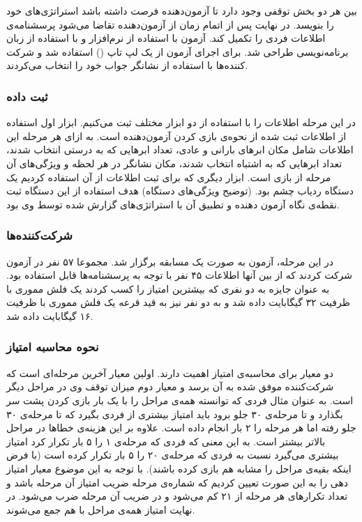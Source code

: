 \documentclass[twoside, a4paper,11pt]{book}
\numberwithin{equation}{chapter}
\numberwithin{table}{chapter}
\numberwithin{figure}{chapter}
\numberwithin{equation}{chapter}
\begin{document}
بین هر دو بخش توقفی وجود دارد تا آزمون‌دهنده فرصت داشته باشد استراتژی‌های خود را بنویسد. در نهایت پس از اتمام زمان از آزمون‌دهنده تقاضا می‌شود پرسشنامه‌ی اطلاعات فردی را تکمیل کند.
آزمون با استفاده از نرم‌افزار  و با استفاده از زبان برنامه‌نویسی   طراحی شد. برای اجرای آزمون از یک لپ تاپ () استفاده شد و شرکت کننده‌ها با استفاده از نشانگر جواب خود را انتخاب می‌کردند.

\subsubsection{ثبت داده}
در این مرحله اطلاعات را با استفاده از دو ابزار مختلف ثبت می‌کنیم. ابزار اول استفاده از اطلاعات ثبت شده از نحوه‌ی بازی کردن آزمون‌دهنده است. به ازای هر مرحله این اطلاعات شامل مکان ابرهای بارانی و عادی، تعداد ابرهایی که به درستی انتخاب شدند، تعداد ابرهایی که به اشتباه انتخاب شدند، مکان نشانگر در هر لحظه و ویژگی‌های آن مرحله از بازی است.
ابزار دیگری که برای ثبت اطلاعات از آن استفاده کردیم یک دستگاه ردیاب چشم بود. (توضیح ویژگی‌های دستگاه) هدف استفاده از این دستگاه ثبت نقطه‌ی نگاه آزمون دهنده و تطبیق آن با استراتژی‌های گزارش شده توسط وی بود.

\subsubsection{شرکت‌کننده‌ها}
در این مرحله، آزمون به صورت یک مسابقه برگزار شد. مجموعا ۵۷ نفر در آزمون شرکت کردند که از بین آنها اطلاعات ۴۵ نفر با توجه به پرسشنامه‌ها قابل استفاده بود. به عنوان جایزه به دو نفری که بیشترین امتیاز را کسب کردند یک فلش مموری با ظرفیت ۳۲ گیگابایت داده شد و به دو نفر نیز به قید قرعه یک فلش مموری با ظرفیت ۱۶ گیگابایت داده شد.

\subsubsection{نحوه محاسبه امتیاز}
دو معیار برای محاسبه‌ی امتیاز اهمیت دارند. اولین معیار آخرین مرحله‌ای است که شرکت‌کننده موفق شده به آن برسد و معیار دوم میزان توقف وی در مراحل دیگر است. به عنوان مثال فردی که توانسته همه‌ی مراحل را با یک بار بازی کردن پشت سر بگذارد و تا مرحله‌ی ۳۰ جلو برود باید امتیاز بیشتری از فردی بگیرد که تا مرحله‌ی ۳۰ جلو رفته اما هر مرحله را ۲ بار انجام داده است.
علاوه بر این هزینه‌ی خطاها در مراحل بالاتر بیشتر است. به این معنی که فردی که مرحله‌ی ۱ را ۵ بار تکرار کرد امتیاز بیشتری می‌گیرد نسبت به فردی که مرحله‌ی ۲۰ را ۵ بار تکرار کرده است (با فرض اینکه بقیه‌ی مراحل را مشابه هم بازی کرده باشند).
با توجه به این موضوع معیار امتیاز دهی را به این صورت تعیین کردیم که شماره‌ی مرحله ضریب امتیاز آن مرحله باشد و تعداد تکرارهای هر مرحله از ۲۱ کم می‌شود و در ضریب آن مرحله ضرب می‌شود. در نهایت امتیاز همه‌ی مراحل با هم جمع می‌شوند.
\end{document}
